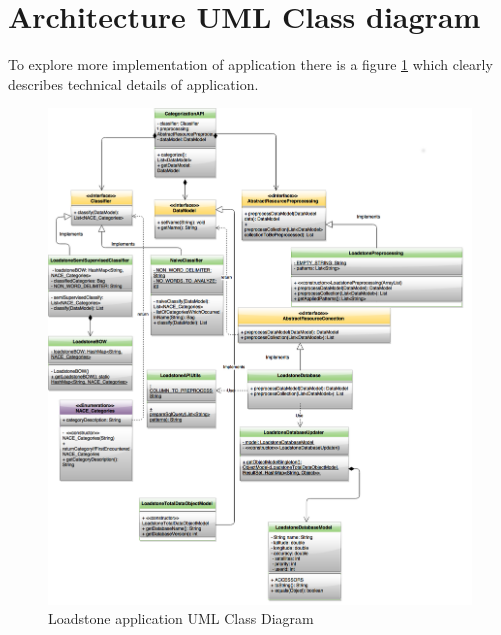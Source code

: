 \section{Architecture UML Class diagram}
To explore more implementation of application there is a figure \ref{fig:@=loadstone_uml} which clearly describes technical details of application.
\begin{figure}
	\centering
	\includegraphics[scale=0.4]{UML.png}
	\caption{Loadstone application UML Class Diagram}
	\label{fig:@=loadstone_uml}
\end{figure}
